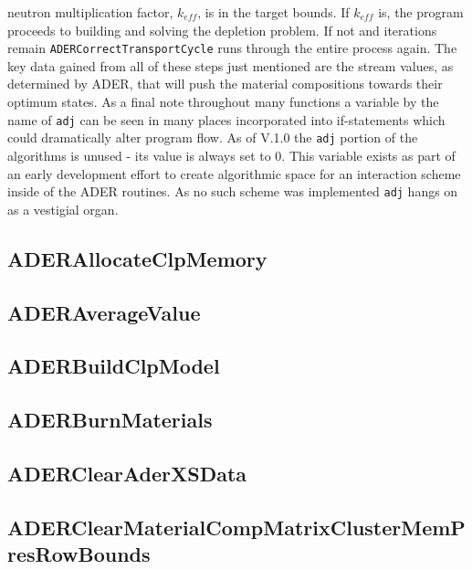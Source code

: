 neutron multiplication factor, $k_{eff}$, is in the target bounds. If
$k_{eff}$ is, the program proceeds to building and solving the depletion
problem. If not and iterations remain \texttt{ADERCorrectTransportCycle} runs
through the entire process again. The key data gained from all of these steps
just mentioned are the stream values, as determined by ADER, that will
push the material compositions towards their optimum states.
As a final note throughout many functions a variable by the name of \texttt{adj}
can be seen in many places incorporated into if-statements which could
dramatically alter program flow. As of V.1.0 the \texttt{adj} portion of the
algorithms is unused - its value is always set to 0. This variable exists as
part of an early development effort to create algorithmic space for an
interaction scheme inside of the ADER routines. As no such scheme was implemented
\texttt{adj} hangs on as a vestigial organ.

\subsection{ADERAllocateClpMemory}


\subsection{ADERAverageValue}


\subsection{ADERBuildClpModel}


\subsection{ADERBurnMaterials}


\subsection{ADERClearAderXSData}


\subsection{ADERClearMaterialCompMatrixClusterMemPresRowBounds}


